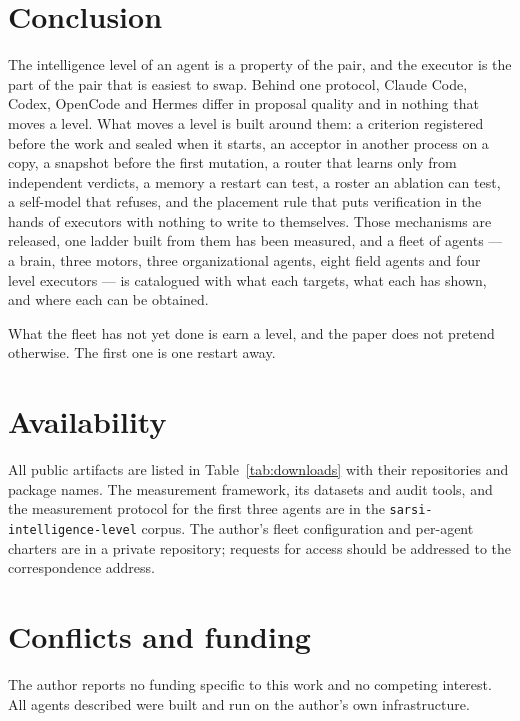 \section{Conclusion}\label{sec:conclusion}

The intelligence level of an agent is a property of the pair, and the executor is the part of the pair that is easiest to swap. Behind one protocol, Claude Code, Codex, OpenCode and Hermes differ in proposal quality and in nothing that moves a level. What moves a level is built around them: a criterion registered before the work and sealed when it starts, an acceptor in another process on a copy, a snapshot before the first mutation, a router that learns only from independent verdicts, a memory a restart can test, a roster an ablation can test, a self-model that refuses, and the placement rule that puts verification in the hands of executors with nothing to write to themselves. Those mechanisms are released, one ladder built from them has been measured, and a fleet of agents --- a brain, three motors, three organizational agents, eight field agents and four level executors --- is catalogued with what each targets, what each has shown, and where each can be obtained.

What the fleet has not yet done is earn a level, and the paper does not pretend otherwise. The first one is one restart away.

\section*{Availability}

All public artifacts are listed in Table~\ref{tab:downloads} with their repositories and package names. The measurement framework, its datasets and audit tools, and the measurement protocol for the first three agents are in the \texttt{sarsi-intelligence-level} corpus. The author's fleet configuration and per-agent charters are in a private repository; requests for access should be addressed to the correspondence address.

\section*{Conflicts and funding}

The author reports no funding specific to this work and no competing interest. All agents described were built and run on the author's own infrastructure.
